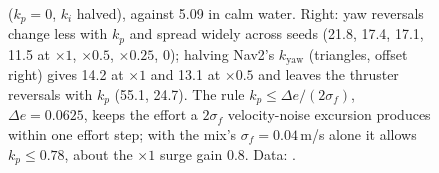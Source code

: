 \begin{figure}[tbp]
{($k_p = 0$, $k_i$ halved), against 5.09 in calm water. Right: yaw reversals
change less with $k_p$ and spread widely across seeds (21.8, 17.4, 17.1, 11.5 at $\times 1$,
$\times 0.5$, $\times 0.25$, 0); halving Nav2's $k_{\text{yaw}}$ (triangles, offset right)
gives 14.2 at $\times 1$ and 13.1 at $\times 0.5$ and leaves the thruster reversals with
$k_p$ (55.1, 24.7). The rule $k_p \le \Delta e / (2\sigma_f)$, $\Delta e = 0.0625$, keeps the
effort a $2\sigma_f$ velocity-noise excursion produces within one effort step; with the
mix's $\sigma_f = 0.04$\,m/s alone it allows $k_p \le 0.78$, about the $\times 1$ surge gain 0.8. Data:
.}
\label{fig:noise}
\end{figure}

